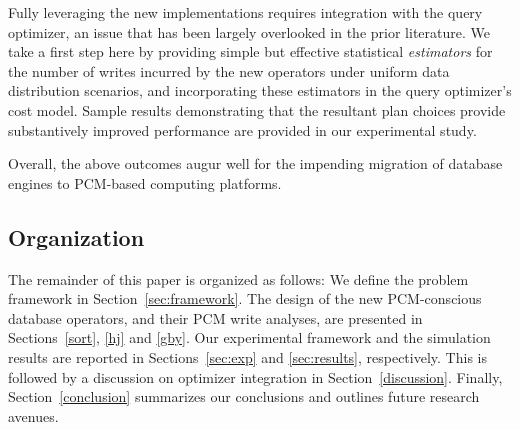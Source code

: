 Fully leveraging the new implementations requires integration with
the query optimizer, an issue that has been largely overlooked in
the prior literature. We take a first step here by providing simple
but effective statistical \emph{estimators} for the number of writes
incurred by the new operators under uniform data distribution scenarios,
and incorporating these estimators in the query optimizer's cost model.
Sample results demonstrating that the resultant plan choices provide
substantively improved performance are provided in our experimental study.

Overall, the above outcomes augur well for the impending migration
of database engines to PCM-based computing platforms.

\subsection*{Organization}
The remainder of this paper is organized as follows: We define the
problem framework in Section~\ref{sec:framework}. The design of the new
PCM-conscious database operators, and their PCM write analyses,
are presented in Sections~\ref{sort}, \ref{hj} and \ref{gby}.
Our experimental framework and the simulation results are reported in
Sections~\ref{sec:exp} and \ref{sec:results}, respectively. This is followed by a
discussion on optimizer integration in Section~\ref{discussion}. Finally,
Section~\ref{conclusion} summarizes our conclusions and outlines future
research avenues.